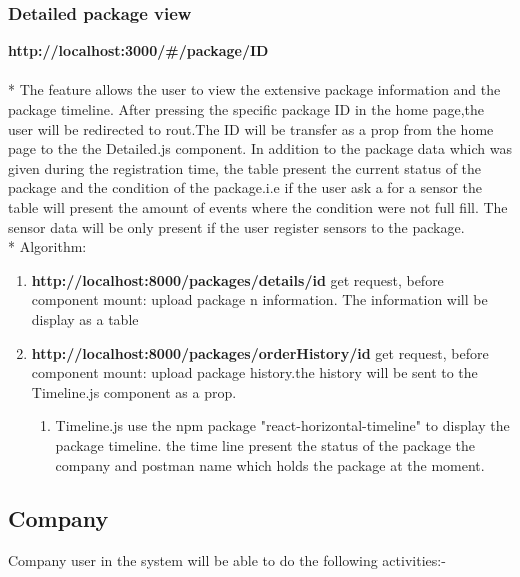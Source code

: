 \subsubsection{Detailed package view}
\textbf{http://localhost:3000/\#/package/ID}\\
\\*
The feature allows the user to view the extensive package information and the package timeline.
After pressing the specific package ID in the home page,the user will be redirected to rout.The ID will be transfer as a prop from the home page to the the Detailed.js component. 
In addition to the package data which was given during the registration time, the table present the current status of the package and the condition of the package.i.e if the user ask a for a sensor the table will present the amount of events where the condition were not full fill.
The sensor data will be only present if the user register sensors to the package.\\*
Algorithm:
\begin{enumerate}
  \item \textbf{http://localhost:8000/packages/details/id}  get request, before component mount: upload package n information. The information will be display as a table
  \item \textbf{http://localhost:8000/packages/orderHistory/id}  get request, before component mount: upload package history.the history will be sent to the Timeline.js component as a prop.
  \begin{enumerate}
      \item Timeline.js use the npm package "react-horizontal-timeline" to display the package timeline.
      the time line present the status of the package the company and postman name which holds the package at the moment.
    \end{enumerate}
\end{enumerate}





\subsection{Company}

Company user in the system will be able to do the following activities:-

